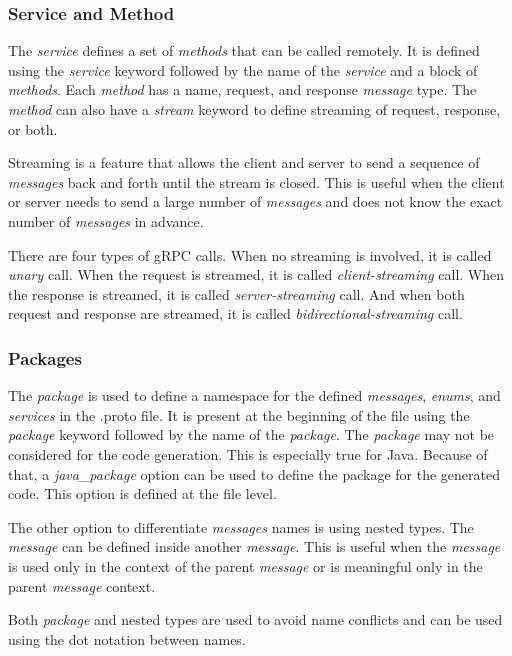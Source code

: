 \subsubsection{Service and Method}
The \textit{service} defines a set of \textit{methods} that can be called remotely.
It is defined using the \textit{service} keyword followed by the name of the \textit{service} and a block of \textit{methods}.
Each \textit{method} has a name, request, and response \textit{message} type.
The \textit{method} can also have a \textit{stream} keyword to define streaming of request, response, or both.
\cite{protobuf-proto3}

Streaming is a feature that allows the client and server to send a sequence of \textit{messages} back and forth until the stream is closed.
This is useful when the client or server needs to send a large number of \textit{messages} and does not know the exact number of \textit{messages} in advance.
\cite{protobuf-proto3}

There are four types of gRPC calls.
When no streaming is involved, it is called \textit{unary} call.
When the request is streamed, it is called \textit{client-streaming} call.
When the response is streamed, it is called \textit{server-streaming} call.
And when both request and response are streamed, it is called \textit{bidirectional-streaming} call.
\cite{grpc-core-concept}

\subsubsection{Packages}
The \textit{package} is used to define a namespace for the defined \textit{messages}, \textit{enums}, and \textit{services} in the .proto file.
It is present at the beginning of the file using the \textit{package} keyword followed by the name of the \textit{package}.
The \textit{package} may not be considered for the code generation.
This is especially true for Java.
Because of that, a \textit{java\_package} option can be used to define the package for the generated code.
This option is defined at the file level.
\cite{protobuf-proto3}

The other option to differentiate \textit{messages} names is using nested types.
The \textit{message} can be defined inside another \textit{message}.
This is useful when the \textit{message} is used only in the context of the parent \textit{message} or is meaningful only in the parent \textit{message} context.
\cite{protobuf-proto3}

Both \textit{package} and nested types are used to avoid name conflicts and can be used using the dot notation between names.

